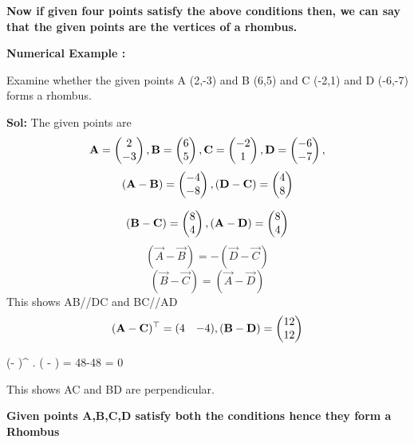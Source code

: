 \documentclass{article}
\begin{document}
\vspace{5mm} %
\textbf{Now if given four points satisfy the above conditions then, we can say that the given points are the vertices of a rhombus.}

 
 \vspace{20cm}
\textbf{Numerical Example :}
 \vspace{0.2cm}

Examine whether the given points A (2,-3) and B (6,5) and C (-2,1) and D (-6,-7) forms a rhombus.

 \textbf{Sol:}
 The given points are
 \begin{align*}
\mathbf{A} = \begin{pmatrix}2\\-3\end{pmatrix}, \mathbf{B} =\begin{pmatrix}6\\5\end{pmatrix},
\mathbf{C} =\begin{pmatrix}-2\\1\end{pmatrix}, \mathbf{D} =\begin{pmatrix}-6\\-7\end{pmatrix},
\end{align*}
$$(\mathbf{A}-\mathbf{B} ) = \begin{pmatrix}-4\\-8\end{pmatrix}, (\mathbf{D}-\mathbf{C} ) = \begin{pmatrix}4\\8\end{pmatrix}$$

$$(\mathbf{B}-\mathbf{C} ) = \begin{pmatrix}8\\4\end{pmatrix}, (\mathbf{A}-\mathbf{D} ) = \begin{pmatrix}8\\4\end{pmatrix}$$
$$(\vec{A}-\vec{B} ) = -(\vec{D}-\vec{C} )$$
$$(\vec{B}-\vec{C} ) = (\vec{A}-\vec{D} )$$
This shows AB//DC and BC//AD
$$(\mathbf{A}-\mathbf{C} )^\top = \begin{matrix}
(4 & -4 )
\end{matrix},(\mathbf{B}-\mathbf{D} ) = \begin{pmatrix}12\\12\end{pmatrix}$$

$$(- )^ \top. ( - ) = 48-48 = 0

This shows AC and BD are perpendicular.
 \vspace{0.2cm}

\textbf{Given points A,B,C,D satisfy both the conditions hence they form a Rhombus}





 
\end{document}
